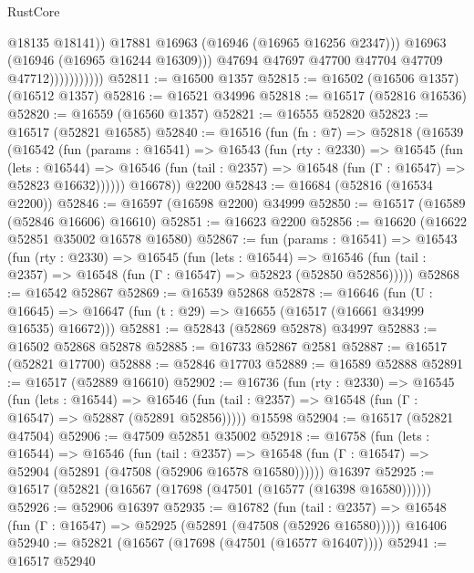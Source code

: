 \begin{lexlean}{RustCore}
\begin{coremodule}
                                  @18135
                                  @18141))
                              @17881
                              @16963
                              (@16946 (@16965 @16256 @2347)))
                            @16963
                            (@16946 (@16965 @16244 @16309)))
                          @47694
                          @47697
                          @47700
                          @47704
                          @47709
                          @47712)))))))))))
@52811 := @16500 @1357
@52815 := @16502 (@16506 @1357) (@16512 @1357)
@52816 := @16521 @34996
@52818 := @16517 (@52816 @16536)
@52820 := @16559 (@16560 @1357)
@52821 := @16555 @52820
@52823 := @16517 (@52821 @16585)
@52840 := @16516
    (fun (fn : @7) =>
    @52818
      (@16539
        (@16542
          (fun (params : @16541) =>
          @16543
            (fun (rty : @2330) =>
            @16545
              (fun (lets : @16544) =>
              @16546 (fun (tail : @2357) => @16548 (fun (Γ : @16547) => @52823 @16632))))))
        @16678))
    @2200
@52843 := @16684 (@52816 (@16534 @2200))
@52846 := @16597 (@16598 @2200) @34999
@52850 := @16517 (@16589 (@52846 @16606) @16610)
@52851 := @16623 @2200
@52856 := @16620 (@16622 @52851 @35002 @16578 @16580)
@52867 := fun (params : @16541) =>
  @16543
    (fun (rty : @2330) =>
    @16545
      (fun (lets : @16544) =>
      @16546 (fun (tail : @2357) => @16548 (fun (Γ : @16547) => @52823 (@52850 @52856)))))
@52868 := @16542 @52867
@52869 := @16539 @52868
@52878 := @16646
    (fun (U : @16645) => @16647 (fun (t : @29) => @16655 (@16517 (@16661 @34999 @16535) @16672)))
@52881 := @52843 (@52869 @52878) @34997
@52883 := @16502 @52868 @52878
@52885 := @16733 @52867 @2581
@52887 := @16517 (@52821 @17700)
@52888 := @52846 @17703
@52889 := @16589 @52888
@52891 := @16517 (@52889 @16610)
@52902 := @16736
    (fun (rty : @2330) =>
    @16545
      (fun (lets : @16544) =>
      @16546 (fun (tail : @2357) => @16548 (fun (Γ : @16547) => @52887 (@52891 @52856)))))
    @15598
@52904 := @16517 (@52821 @47504)
@52906 := @47509 @52851 @35002
@52918 := @16758
    (fun (lets : @16544) =>
    @16546
      (fun (tail : @2357) =>
      @16548 (fun (Γ : @16547) => @52904 (@52891 (@47508 (@52906 @16578 @16580))))))
    @16397
@52925 := @16517 (@52821 (@16567 (@17698 (@47501 (@16577 (@16398 @16580))))))
@52926 := @52906 @16397
@52935 := @16782
    (fun (tail : @2357) => @16548 (fun (Γ : @16547) => @52925 (@52891 (@47508 (@52926 @16580)))))
    @16406
@52940 := @52821 (@16567 (@17698 (@47501 (@16577 @16407))))
@52941 := @16517 @52940

\end{coremodule}
\end{lexlean}
